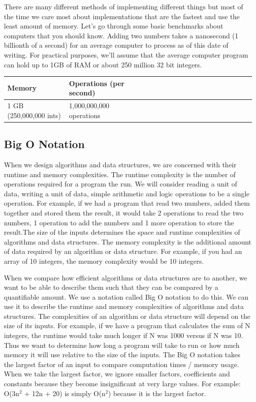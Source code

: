 \documentclass[11pt,oneside]{book}
\begin{document}
There are many different methods of implementing different things but most of the time we care most about implementations that are the fastest and use the least amount of memory. Let's go through some basic benchmarks about computers that you should know. Adding two numbers takes a nanosecond (1 billionth of a second) for an average computer to process as of this date of writing. For practical purposes, we'll assume that the average computer program can hold up to 1GB of RAM or about 250 million 32 bit integers.

\begin{center}\begin{tabulary}{0.4\linewidth}{|l|l|l|l|l|l|l|l|l|l|l|l|l|l|l|l|l|l|l}\hline


  Memory &
  Operations (per second)\\
\hline


  1 GB (250,000,000 ints) &
  1,000,000,000 operations\\

\hline\end{tabulary}\end{center}

\subsection{Big O Notation}

When we design algorithms and data structures, we are concerned with their runtime and memory complexities. The runtime complexity is the number of operations required for a program the run. We will consider reading a unit of data, writing a unit of data, simple arithmetic and logic operations to be a single operation. For example, if we had a program that read two numbers, added them together and stored them the result, it would take 2 operations to read the two numbers, 1 operation to add the numbers and 1 more operation to store the result.The size of the inputs determines the space and runtime complexities of algorithms and data structures. The memory complexity is the additional amount of data required by an algorithm or data structure. For example, if you had an array of 10 integers, the memory complexity would be 10 integers.

When we compare how efficient algorithms or data structures are to another, we want to be able to describe them such that they can be compared by a quantifiable amount. We use a notation called Big O notation to do this. We can use it to describe the runtime and memory complexities of algorithms and data structures. The complexities of an algorithm or data structure will depend on the size of its inputs. For example, if we have a program that calculates the sum of N integers, the runtime would take much longer if N was 1000 versus if N was 10. Thus we want to determine how long a program will take to run or how much memory it will use relative to the size of the inputs. The Big O notation takes the largest factor of an input to compare computation times / memory usage. When we take the largest factor, we ignore smaller factors, coefficients and constants because they become insignificant at very large values. For example: O(3n$^{2}$ + 12n + 20) is simply O(n$^{2}$) because it is the largest factor.
\end{document}
